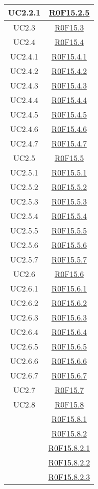\documentclass[../AnalisiDeiRequisiti.tex]{subfiles}
\begin{document}
\begin{longtable}{|c|c|}
	UC2.2.1 & \hyperlink{R0F15.2.5}{R0F15.2.5}\\\hline
	UC2.3 & \hyperlink{R0F15.3}{R0F15.3}\\\hline
	UC2.4 & \hyperlink{R0F15.4}{R0F15.4}\\\hline
	UC2.4.1 & \hyperlink{R0F15.4.1}{R0F15.4.1}\\\hline
	UC2.4.2 & \hyperlink{R0F15.4.2}{R0F15.4.2}\\\hline
	UC2.4.3 & \hyperlink{R0F15.4.3}{R0F15.4.3}\\\hline
	UC2.4.4 & \hyperlink{R0F15.4.4}{R0F15.4.4}\\\hline
	UC2.4.5 & \hyperlink{R0F15.4.5}{R0F15.4.5}\\\hline
	UC2.4.6 & \hyperlink{R0F15.4.6}{R0F15.4.6}\\\hline
	UC2.4.7 & \hyperlink{R0F15.4.7}{R0F15.4.7}\\\hline
	UC2.5 & \hyperlink{R0F15.5}{R0F15.5}\\\hline
	UC2.5.1 & \hyperlink{R0F15.5.1}{R0F15.5.1}\\\hline
	UC2.5.2 & \hyperlink{R0F15.5.2}{R0F15.5.2}\\\hline
	UC2.5.3 & \hyperlink{R0F15.5.3}{R0F15.5.3}\\\hline
	UC2.5.4 & \hyperlink{R0F15.5.4}{R0F15.5.4}\\\hline
	UC2.5.5 & \hyperlink{R0F15.5.5}{R0F15.5.5}\\\hline
	UC2.5.6 & \hyperlink{R0F15.5.6}{R0F15.5.6}\\\hline
	UC2.5.7 & \hyperlink{R0F15.5.7}{R0F15.5.7}\\\hline
	UC2.6 & \hyperlink{R0F15.6}{R0F15.6}\\\hline
	UC2.6.1 & \hyperlink{R0F15.6.1}{R0F15.6.1}\\\hline
	UC2.6.2 & \hyperlink{R0F15.6.2}{R0F15.6.2}\\\hline
	UC2.6.3 & \hyperlink{R0F15.6.3}{R0F15.6.3}\\\hline
	UC2.6.4 & \hyperlink{R0F15.6.4}{R0F15.6.4}\\\hline
	UC2.6.5 & \hyperlink{R0F15.6.5}{R0F15.6.5}\\\hline
	UC2.6.6 & \hyperlink{R0F15.6.6}{R0F15.6.6}\\\hline
	UC2.6.7 & \hyperlink{R0F15.6.7}{R0F15.6.7}\\\hline
	UC2.7 & \hyperlink{R0F15.7}{R0F15.7}\\\hline
	UC2.8 & \hyperlink{R0F15.8}{R0F15.8}\\& \hyperlink{R0F15.8.1}{R0F15.8.1}\\& \hyperlink{R0F15.8.2}{R0F15.8.2}\\& \hyperlink{R0F15.8.2.1}{R0F15.8.2.1}\\& \hyperlink{R0F15.8.2.2}{R0F15.8.2.2}\\& \hyperlink{R0F15.8.2.3}{R0F15.8.2.3}\\\hline

\end{longtable}
\end{document}
